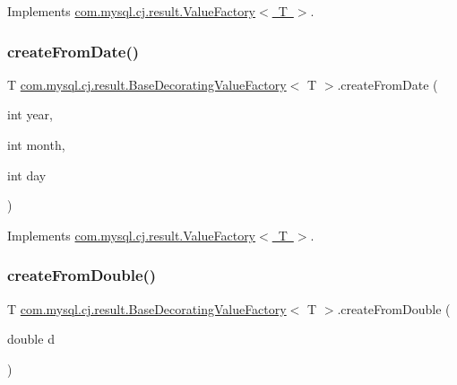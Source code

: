Implements \mbox{\hyperlink{interfacecom_1_1mysql_1_1cj_1_1result_1_1_value_factory_a0724fcd13ef1ef07c781a61167847a11}{com.\+mysql.\+cj.\+result.\+Value\+Factory$<$ T $>$}}.

\mbox{\label{classcom_1_1mysql_1_1cj_1_1result_1_1_base_decorating_value_factory_a4c72385aed83cc4c020b79beabe53a5e}} 
\subsubsection{\texorpdfstring{create\+From\+Date()}{createFromDate()}}
{\footnotesize\ttfamily T \mbox{\hyperlink{classcom_1_1mysql_1_1cj_1_1result_1_1_base_decorating_value_factory}{com.\+mysql.\+cj.\+result.\+Base\+Decorating\+Value\+Factory}}$<$ T $>$.create\+From\+Date (\begin{DoxyParamCaption}\item[{int}]{year,  }\item[{int}]{month,  }\item[{int}]{day }\end{DoxyParamCaption})}



Implements \mbox{\hyperlink{interfacecom_1_1mysql_1_1cj_1_1result_1_1_value_factory_a5c7828e8fe372c9070e0e64ddafac761}{com.\+mysql.\+cj.\+result.\+Value\+Factory$<$ T $>$}}.

\mbox{\label{classcom_1_1mysql_1_1cj_1_1result_1_1_base_decorating_value_factory_a7339df10ef5bc202ad0568b232afd530}} 
\subsubsection{\texorpdfstring{create\+From\+Double()}{createFromDouble()}}
{\footnotesize\ttfamily T \mbox{\hyperlink{classcom_1_1mysql_1_1cj_1_1result_1_1_base_decorating_value_factory}{com.\+mysql.\+cj.\+result.\+Base\+Decorating\+Value\+Factory}}$<$ T $>$.create\+From\+Double (\begin{DoxyParamCaption}\item[{double}]{d }\end{DoxyParamCaption})}



